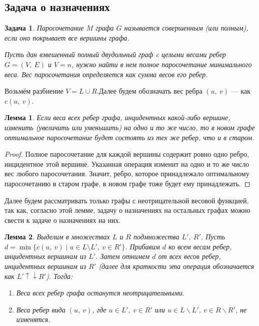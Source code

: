 \documentclass[a4paper,12pt]{article}
\newtheorem*{on1n}{Задача}
\newtheorem*{fulllemma}{Лемма}
\begin{document}
\subsection{Задача о назначениях}
\begin{on1n}
Паросочетание $M$ графа $G$ называется совершенным (или полным), если оно покрывает все вершины графа.

Пусть дан взвешенный полный двудольный граф c целыми весами ребер $G = (V,\ E)$ и $V = n$, нужно найти в нем полное паросочетание минимального веса. Вес паросочетания определяется как сумма весов его ребер. 
\end{on1n}
Возьмём разбиение $V = L\cup R$.Далее будем обозначать вес ребра $(u,\ v)$ — как $c(u,\ v)$.
\begin{fulllemma}
Если веса всех ребер графа, инцидентных какой-либо вершине, изменить (увеличить или уменьшить) на одно и то же число, то в новом графе оптимальное паросочетание будет состоять из тех же ребер, что и в старом.
\end{fulllemma}
\begin{proof}
Полное паросочетание для каждой вершины содержит ровно одно ребро, инцидентное этой вершине. Указанная операция изменит на одно и то же число вес любого паросочетания. Значит, ребро, которое принадлежало оптимальному паросочетанию в старом графе, в новом графе тоже будет ему принадлежать.
\end{proof}
Далее будем рассматривать только графы с неотрицательной весовой функцией, так как, согласно этой лемме, задачу о назначениях на остальных графах можно свести к задаче о назначениях на них.
\begin{fulllemma}
Выделим в множествах $L$ и $R$ подмножества $L',\ R'$. Пусть $d = \min \{c(u,\ v) \mid u \in L \setminus L',\ v \in R'\}$. Прибавим $d$ ко всем весам ребер, инцидентных вершинам из $L'$. Затем отнимем $d$ от всех весов ребер, инцидентных вершинам из $R'$ (далее для краткости эта операция обозначается как $L' \uparrow\downarrow R'$). Тогда:
\begin{enumerate}
    \item Веса всех ребер графа останутся неотрицательными.
    \item Веса ребер вида $(u,\ v)$, где $u \in L',\ v \in R'$ или $u \in L \backslash L',\ v \in R \backslash R'$, не изменятся.
\end{enumerate}
\end{fulllemma}
\end{document}
